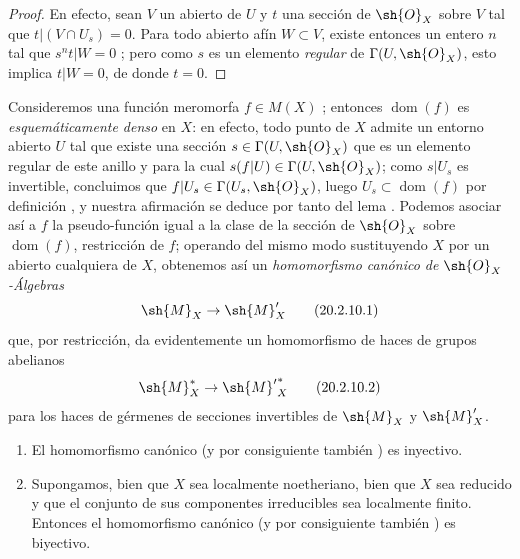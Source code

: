 \begin{proof}
En efecto, sean $V$ un abierto de $U$ y $t$ una sección de $\sh{O}_X$ sobre $V$ tal que $t|(V\cap U_s)=0$.
Para todo abierto afín $W\subset V$, existe entonces un entero $n$ tal que $s^nt|W=0$ ; pero como $s$ es un elemento \emph{regular} de $\Gamma(U,\sh{O}_X)$, esto implica $t|W=0$, de donde $t=0$.
\end{proof}

\begin{env}[20.2.10]
\label{IV.20.2.10}
Consideremos una función meromorfa $f\in M(X)$ ; entonces $\operatorname{dom}(f)$ es \emph{esquemáticamente denso} en $X$: en efecto, todo punto de $X$ admite un entorno abierto $U$ tal que existe una sección $s\in\Gamma(U,\sh{O}_X)$ que es un elemento regular de este anillo y para la cual $s(f|U)\in\Gamma(U,\sh{O}_X)$; como $s|U_s$ es invertible, concluimos que $f|U_s\in\Gamma(U_s,\sh{O}_X)$, luego $U_s\subset\operatorname{dom}(f)$ por definición , y nuestra afirmación se deduce por tanto del lema .
Podemos asociar así a $f$ la pseudo-función igual a la clase de la sección de $\sh{O}_X$ sobre $\operatorname{dom}(f)$, restricción de $f$; operando del mismo modo sustituyendo $X$ por un abierto cualquiera de $X$, obtenemos así un \emph{homomorfismo canónico de $\sh{O}_X$-Álgebras}
\[
\label{IV.20.2.10.1}
  \sh{M}_X\to\sh{M}'_X
  \tag{20.2.10.1}
\]
que, por restricción, da evidentemente un homomorfismo de haces de grupos abelianos
\[
\label{IV.20.2.10.2}
  \sh{M}_X^*\to{\sh{M}'}^*_X
  \tag{20.2.10.2}
\]
para los haces de gérmenes de secciones invertibles de $\sh{M}_X$ y $\sh{M}'_X$.
\end{env}

\begin{proposition}[20.2.11]
\label{IV.20.2.11}
\medskip
\begin{enumerate}[label=\emph{(\roman*)}]
  \item El homomorfismo canónico \emph{} \textup{(y por consiguiente también \emph{})} es inyectivo.
  \item Supongamos, bien que $X$ sea localmente noetheriano, bien que $X$ sea reducido y que el conjunto de sus componentes irreducibles sea localmente finito.
  Entonces el homomorfismo canónico \emph{} \textup{(y por consiguiente también \emph{})} es biyectivo.
\end{enumerate}
\end{proposition}

